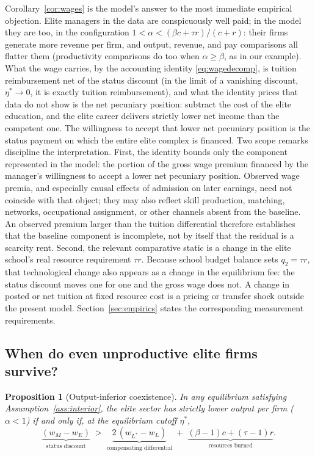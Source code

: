 \documentclass[12pt,letterpaper]{article}
\newtheorem{proposition}{Proposition}
\theoremstyle{definition}
\begin{document}
Corollary~\ref{cor:wages} is the model's answer to the most immediate empirical objection.
Elite managers in the data are conspicuously well paid; in the model they are too, in the configuration $1 < \alpha < (\beta c+\tau r)/(c+r)$: their firms generate more revenue per firm, and output, revenue, and pay comparisons all flatter them (productivity comparisons do too when $\alpha\geq\beta$, as in our example).
What the wage carries, by the accounting identity \eqref{eq:wagedecomp}, is tuition reimbursement net of the status discount (in the limit of a vanishing discount, $\eta^\ast\to 0$, it is exactly tuition reimbursement), and what the identity prices that data do not show is the net pecuniary position: subtract the cost of the elite education, and the elite career delivers strictly lower net income than the competent one.
The willingness to accept that lower net pecuniary position is the status payment on which the entire elite complex is financed.
Two scope remarks discipline the interpretation.
First, the identity bounds only the component represented in the model: the portion of the gross wage premium financed by the manager's willingness to accept a lower net pecuniary position.
Observed wage premia, and especially causal effects of admission on later earnings, need not coincide with that object; they may also reflect skill production, matching, networks, occupational assignment, or other channels absent from the baseline.
An observed premium larger than the tuition differential therefore establishes that the baseline component is incomplete, not by itself that the residual is a scarcity rent.
Second, the relevant comparative static is a change in the elite school's real resource requirement $\tau r$.
Because school budget balance sets $q_2=\tau r$, that technological change also appears as a change in the equilibrium fee: the status discount moves one for one and the gross wage does not.
A change in posted or net tuition at fixed resource cost is a pricing or transfer shock outside the present model.
Section~\ref{sec:empirics} states the corresponding measurement requirements.

\subsection{When do even unproductive elite firms survive?}

\begin{proposition}[Output-inferior coexistence]\label{prop:coexist} In any equilibrium satisfying Assumption~\ref{ass:interior}, the elite sector has strictly lower output per firm ($\alpha<1$) if and only if, at the equilibrium cutoff $\eta^\ast$,
\begin{equation}\label{eq:coexist}
  \underbrace{(w_M - w_E)}_{\text{status discount}}
  \;>\;
  \underbrace{2\,(w_{L^\ast} - w_L)}_{\text{compensating differential}}
  \;+\;
  \underbrace{(\beta-1)c + (\tau-1)r}_{\text{resources burned}} .
\end{equation}
\end{proposition}
\end{document}
